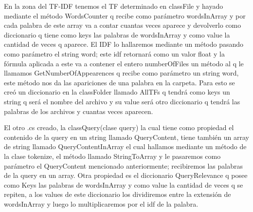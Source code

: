 \documentclass[a4paper,12pt]{article}
\begin{document}
En la zona del TF-IDF tenemos el TF determinado en classFile y hayado mediante el método WordsCounter q recibe como parámetro wordsInArray y por cada palabra de este array va a contar cuantas veces aparece y devolverlo como diccionario q tiene como keys las palabras de wordsInArray y como value la cantidad de veces q aparece. El IDF  lo hallaremos mediante un método pasando como parámetro el string word; este idf retornará como un valor float y la fórmula aplicada a este va a contener el entero numberOfFiles un método al q le llamamos GetNumberOfAppearences q recibe como parámetro un string word, este método nos da las apariciones de una palabra en la carpeta. Para esto se creó un diccionario en la classFolder llamado AllTFs q tendrá como keys un string q será el nombre del archivo y su value será otro diccionario q tendrá las palabras de los archivos y cuantas veces aparecen.

El otro .cs creado, la classQuery(clase query) la cual tiene como propiedad el contenido de la query en un string llamado QueryContent, tiene también un array de string llamado QueryContentInArray el cual hallamos mediante un método de la clase tokenize, el método llamado StringToArray y le pasaremos como parámetro el QueryContent mencionado anteriormente; recibiremos las palabras de la query en un array. Otra propiedad es el diccionario QueryRelevance q posee como Keys las palabras de wordsInArray y como value la cantidad de veces q se repiten, a los values de este diccionario los dividiremos entre la extensión de wordsInArray y luego lo multiplicaremos por el idf de la palabra.
\end{document}
